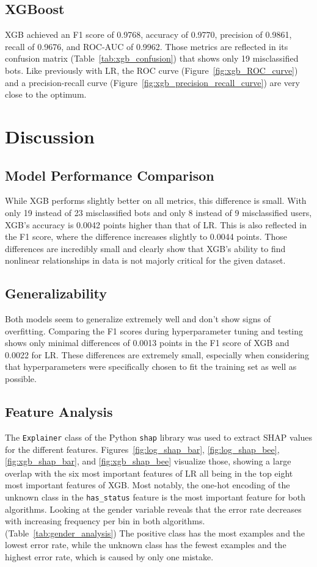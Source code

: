\documentclass[twocolumn]{article}
\begin{document}
\subsection{XGBoost}
XGB achieved an F1 score of 0.9768, accuracy of 0.9770, precision of 0.9861, recall of 0.9676, and ROC-AUC of 0.9962. Those metrics are reflected in its confusion matrix (Table~\ref{tab:xgb_confusion}) that shows only 19 misclassified bots. Like previously with LR, the ROC curve (Figure~\ref{fig:xgb_ROC_curve}) and a precision-recall curve (Figure~\ref{fig:xgb_precision_recall_curve}) are very close to the optimum.

\section{Discussion}

\subsection{Model Performance Comparison}
While XGB performs slightly better on all metrics, this difference is small. With only 19 instead of 23 misclassified bots and only 8 instead of 9 misclassified users, XGB's accuracy is 0.0042 points higher than that of LR. This is also reflected in the F1 score, where the difference increases slightly to 0.0044 points.
Those differences are incredibly small and clearly show that XGB's ability to find nonlinear relationships in data is not majorly critical for the given dataset.

\subsection{Generalizability}

Both models seem to generalize extremely well and don't show signs of overfitting. Comparing the F1 scores during hyperparameter tuning and testing shows only minimal differences of 0.0013 points in the F1 score of XGB and 0.0022 for LR. These differences are extremely small, especially when considering that hyperparameters were specifically chosen to fit the training set as well as possible.

\subsection{Feature Analysis}

The \texttt{Explainer} class of the Python \texttt{shap} library was used to extract SHAP values for the different features. Figures~\ref{fig:log_shap_bar}, \ref{fig:log_shap_bee}, \ref{fig:xgb_shap_bar}, and \ref{fig:xgb_shap_bee} visualize those, showing a large overlap with the six most important features of LR all being in the top eight most important features of XGB. Most notably, the one-hot encoding of the unknown class in the \texttt{has\_status} feature is the most important feature for both algorithms. 
Looking at the gender variable reveals that the error rate decreases with increasing frequency per bin in both algorithms. (Table~\ref{tab:gender_analysis}) The positive class has the most examples and the lowest error rate, while the unknown class has the fewest examples and the highest error rate, which is caused by only one mistake.
\end{document}
